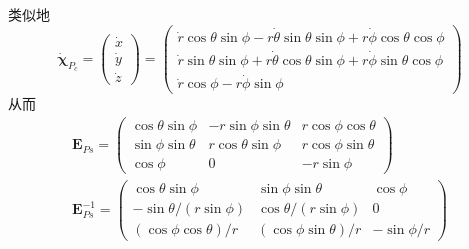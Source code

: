 \documentclass[11pt]{ctexart}
\begin{document}
类似地
$$
\dot{\boldsymbol{\chi}}_{P_{c}}=\left(\begin{array}{c}{\dot{x}}\\{\dot{y}}\\{\dot{z}}\end{array}\right)=\left(\begin{array}{c}{\dot{r}\cos\theta\sin\phi-r\dot{\theta}\sin\theta\sin\phi+r\dot{\phi}\cos\theta\cos\phi}\\{\dot{r}\sin\theta\sin\phi+r\dot{\theta}\cos\theta\sin\phi+r\dot{\phi}\sin\theta\cos\phi}\\{\dot{r}\cos\phi-r\dot{\phi}\sin\phi}\end{array}\right) 
$$
从而
$$
\begin{gathered}
    \mathbf{E}_{Ps}= \left(\begin{array}{ccc}\cos\theta\sin\phi&-r\sin\phi\sin\theta&r\cos\phi\cos\theta\\\sin\phi\sin\theta&r\cos\theta\sin\phi&r\cos\phi\sin\theta\\\cos\phi&0&-r\sin\phi\end{array}\right) \\
    \mathbf{E}_{Ps}^{-1}= \left(\begin{array}{ccc}\cos\theta\sin\phi&\sin\phi\sin\theta&\cos\phi\\-\sin\theta/(r\sin\phi)&\cos\theta/(r\sin\phi)&0\\(\cos\phi\cos\theta)/r&(\cos\phi\sin\theta)/r&-\sin\phi/r\end{array}\right) 
\end{gathered}
$$
\end{document}
